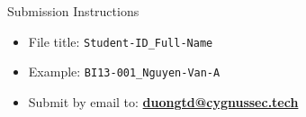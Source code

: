 \begin{frame}[t]{Submission Instructions}
\begin{center}
\end{center}
\vspace{0.25cm}
\begin{itemize}
  \setlength{\itemsep}{0.25cm}
  \item File title: \texttt{Student-ID\_Full-Name}
  \item Example: \texttt{BI13-001\_Nguyen-Van-A}
  \item Submit by email to: \href{mailto:duongtd@cygnussec.tech}{\textcolor{ResearchColor}{\textbf{duongtd@cygnussec.tech}}}
\end{itemize}
\end{frame}
